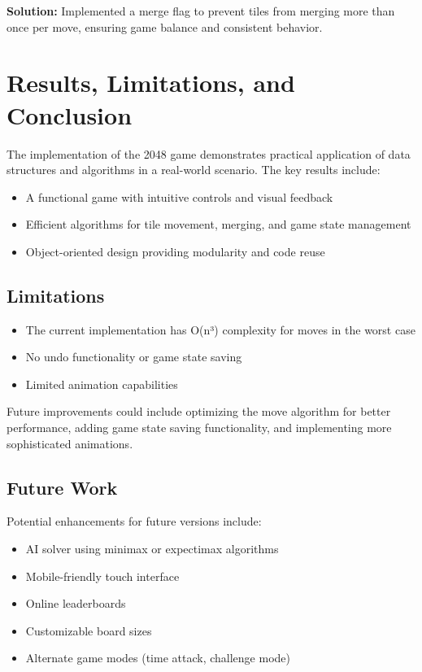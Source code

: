 \documentclass[12pt, a4paper]{article}
\begin{document}
\textbf{Solution:} Implemented a merge flag to prevent tiles from merging more than once per move, ensuring game balance and consistent behavior.

\section{Results, Limitations, and Conclusion}
The implementation of the 2048 game demonstrates practical application of data structures and algorithms in a real-world scenario. The key results include:
\begin{itemize}
    \item A functional game with intuitive controls and visual feedback
    \item Efficient algorithms for tile movement, merging, and game state management
    \item Object-oriented design providing modularity and code reuse
\end{itemize}

\subsection{Limitations}
\begin{itemize}
    \item The current implementation has O(n³) complexity for moves in the worst case
    \item No undo functionality or game state saving
    \item Limited animation capabilities
\end{itemize}

Future improvements could include optimizing the move algorithm for better performance, adding game state saving functionality, and implementing more sophisticated animations.

\subsection{Future Work}
Potential enhancements for future versions include:
\begin{itemize}
    \item AI solver using minimax or expectimax algorithms
    \item Mobile-friendly touch interface
    \item Online leaderboards
    \item Customizable board sizes
    \item Alternate game modes (time attack, challenge mode)
\end{itemize}
\end{document}
